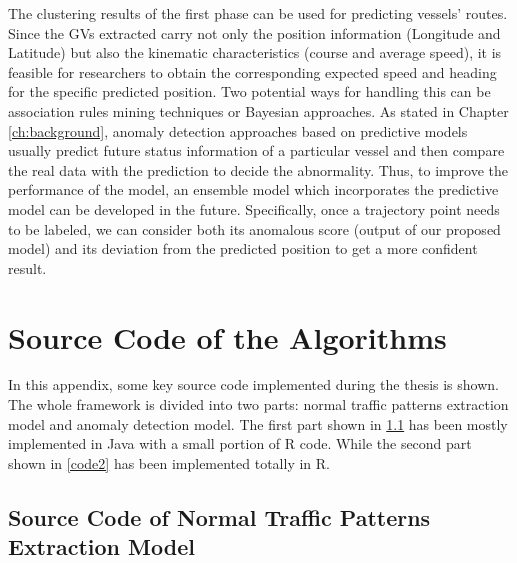 \documentclass[12pt,glossary]{dalcsthesis}
\begin{document}
The clustering results of the first phase can be used for predicting vessels' routes. Since the GVs extracted carry not only the position information (Longitude and Latitude) but also the kinematic characteristics (course and average speed), it is feasible for researchers to obtain the corresponding expected speed and heading for the specific predicted position. Two potential ways for handling this can be association rules mining techniques or Bayesian approaches. As stated in Chapter \ref{ch:background}, anomaly detection approaches based on predictive models usually predict future status information of a particular vessel and then compare the real data with the prediction to decide the abnormality. Thus, to improve the performance of the model, an ensemble model which incorporates the predictive model can be developed in the future. Specifically, once a trajectory point needs to be labeled, we can consider both its anomalous score (output of our proposed model) and its deviation from the predicted position to get a more confident result. 












\appendix

\chapter{Source Code of the Algorithms}

In this appendix, some key source code implemented during the thesis is shown. The whole framework is divided into two parts: normal traffic patterns extraction model and anomaly detection model. The first part shown in \ref{code1} has been mostly implemented in Java with a small portion of R code. While the second part shown in \ref{code2} has been implemented totally in R. 

\section{Source Code of Normal Traffic Patterns Extraction Model}
\label{code1}
\end{document}
